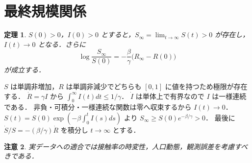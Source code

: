 \documentclass[a5paper,10pt,onecolumn]{jsarticle}
\makeatletter
\theoremstyle{mathnotetheorem}
\newtheorem{theorem}{定理}[section]
\newtheorem{remark}[theorem]{注意}
\renewcommand{\proofname}{証明}
\renewenvironment{proof}[1][\proofname]{%
  \par\pushQED{\qed}\normalfont\topsep4\p@\@plus2\p@\relax
  \trivlist\item[\hskip\labelsep\bfseries #1]\ignorespaces
}{\popQED\endtrivlist\@endpefalse}
\makeatother
\begin{document}
\section{最終規模関係}
\begin{theorem}
$S(0)>0$，$I(0)>0$ とすると，$S_\infty=\lim_{t\to\infty}S(t)>0$ が存在し，
$I(t)\to0$ となる．さらに
\[
 \log\frac{S_\infty}{S(0)}
 =-\frac\beta\gamma\bigl(R_\infty-R(0)\bigr)
\]
が成立する．
\end{theorem}
\begin{proof}
$S$ は単調非増加，$R$ は単調非減少でどちらも $[0,1]$ に値を持つため極限が存在する．
$\dot R=\gamma I$ から $\int_0^\infty I(t)dt\le1/\gamma$．
$\dot I$ は単体上で有界なので $I$ は一様連続である．
非負・可積分・一様連続な関数は零へ収束するから $I(t)\to0$．
$S(t)=S(0)\exp(-\beta\int_0^tI(s)ds)$ より
$S_\infty\ge S(0)e^{-\beta/\gamma}>0$．
最後に $\dot S/S=-(\beta/\gamma)\dot R$ を積分し
$t\to\infty$ とする．
\end{proof}
\begin{remark}
実データへの適合では接触率の時変性，人口動態，観測誤差を考慮すべきである．
\end{remark}
\end{document}
